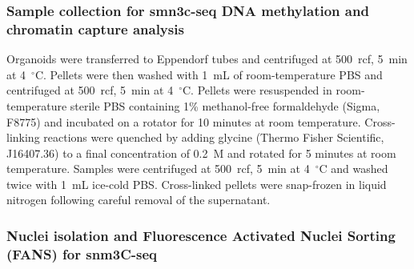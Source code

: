 \subsubsection{Sample collection for smn3c-seq DNA methylation and chromatin capture analysis}

Organoids were transferred to Eppendorf tubes and centrifuged at 500~rcf, 5~min at 4~\ensuremath{^{\circ}}C. Pellets were then washed with 1~mL of room-temperature PBS and centrifuged at 500~rcf, 5~min at 4~\ensuremath{^{\circ}}C. Pellets were resuspended in room-temperature sterile PBS containing 1\% methanol-free formaldehyde (Sigma, F8775) and incubated on a rotator for 10 minutes at room temperature. Cross-linking reactions were quenched by adding glycine (Thermo Fisher Scientific, J16407.36) to a final concentration of 0.2~M and rotated for 5 minutes at room temperature. Samples were centrifuged at 500~rcf, 5~min at 4~\ensuremath{^{\circ}}C and washed twice with 1~mL ice-cold PBS. Cross-linked pellets were snap-frozen in liquid nitrogen following careful removal of the supernatant.

\subsubsection{Nuclei isolation and Fluorescence Activated Nuclei Sorting (FANS) for snm3C-seq}

